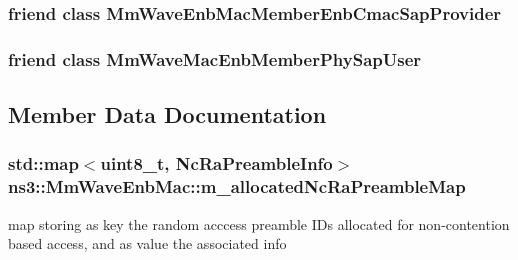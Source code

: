 \subsubsection[{\texorpdfstring{Mm\+Wave\+Enb\+Mac\+Member\+Enb\+Cmac\+Sap\+Provider}{MmWaveEnbMacMemberEnbCmacSapProvider}}]{\setlength{\rightskip}{0pt plus 5cm}friend class {\bf Mm\+Wave\+Enb\+Mac\+Member\+Enb\+Cmac\+Sap\+Provider}\hspace{0.3cm}{\ttfamily [friend]}}\hypertarget{classns3_1_1MmWaveEnbMac_a1a1c8254dd4074e41aff36b4439fbdc2}{}\label{classns3_1_1MmWaveEnbMac_a1a1c8254dd4074e41aff36b4439fbdc2}
\subsubsection[{\texorpdfstring{Mm\+Wave\+Mac\+Enb\+Member\+Phy\+Sap\+User}{MmWaveMacEnbMemberPhySapUser}}]{\setlength{\rightskip}{0pt plus 5cm}friend class {\bf Mm\+Wave\+Mac\+Enb\+Member\+Phy\+Sap\+User}\hspace{0.3cm}{\ttfamily [friend]}}\hypertarget{classns3_1_1MmWaveEnbMac_ab0e8f39afa1fd3c520a5a9c56dd65722}{}\label{classns3_1_1MmWaveEnbMac_ab0e8f39afa1fd3c520a5a9c56dd65722}


\subsection{Member Data Documentation}
\subsubsection[{\texorpdfstring{m\+\_\+allocated\+Nc\+Ra\+Preamble\+Map}{m_allocatedNcRaPreambleMap}}]{\setlength{\rightskip}{0pt plus 5cm}std\+::map$<$uint8\+\_\+t, {\bf Nc\+Ra\+Preamble\+Info}$>$ ns3\+::\+Mm\+Wave\+Enb\+Mac\+::m\+\_\+allocated\+Nc\+Ra\+Preamble\+Map\hspace{0.3cm}{\ttfamily [private]}}\hypertarget{classns3_1_1MmWaveEnbMac_a3138c3896ca19151f6a08008669e07da}{}\label{classns3_1_1MmWaveEnbMac_a3138c3896ca19151f6a08008669e07da}
map storing as key the random acccess preamble I\+Ds allocated for non-\/contention based access, and as value the associated info 
